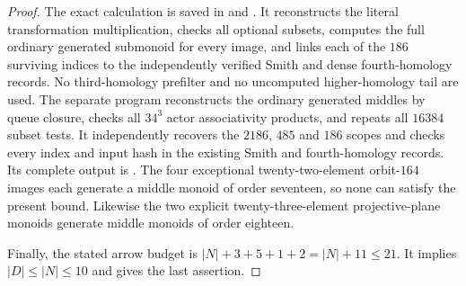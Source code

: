 \begin{proof}
The exact calculation is saved in
and
.
It reconstructs the literal transformation multiplication,
checks all optional subsets, computes the full ordinary
generated submonoid for every image, and links each of the
$186$ surviving indices to the independently verified Smith
and dense fourth-homology records.  No third-homology
prefilter and no uncomputed higher-homology tail are used.
The separate program
reconstructs the ordinary generated middles by queue closure,
checks all $34^3$ actor associativity products, and repeats
all $16384$ subset tests.  It independently recovers the
$2186$, $485$ and $186$ scopes and checks every index and
input hash in the existing Smith and fourth-homology records.
Its complete output is
.
The four exceptional twenty-two-element orbit-$164$ images
each generate a middle monoid of order seventeen, so none
can satisfy the present bound.  Likewise the two explicit
twenty-three-element projective-plane monoids generate
middle monoids of order eighteen.

Finally, the stated arrow budget is
$|N|+3+5+1+2=|N|+11\le21$.  It implies
$|D|\le|N|\le10$ and gives the last assertion.
\end{proof}
